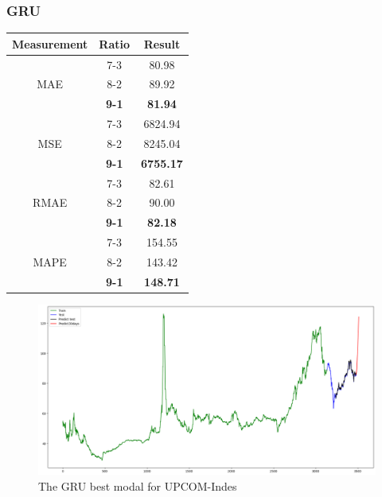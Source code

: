 \documentclass{ieeeojies}
\begin{document}
\subsubsection{GRU}
\begin{table}[H]
    \centering
    \begin{tabular}{|c|c|c|}
        \hline
         Measurement & Ratio &  Result  \\
        \hline
             & 7-3 & 80.98  \\
        MAE  & 8-2 &  89.92 \\
            & \textbf{9-1} & \textbf{81.94}  \\
        \hline
           & 7-3 & 6824.94  \\
        MSE  & 8-2 & 8245.04  \\
            & \textbf{9-1} & \textbf{6755.17}  \\
        \hline
           & 7-3 & 82.61  \\
        RMAE  & 8-2 & 90.00  \\
            & \textbf{9-1} & \textbf{82.18}  \\
        \hline
           & 7-3 & 154.55  \\
        MAPE  & 8-2 & 143.42  \\
            & \textbf{9-1} & \textbf{148.71}  \\
        \hline
    \end{tabular}
    \label{table:example}
\end{table}
\begin{figure}[H]
    \centering
    \includegraphics[width=0.8\linewidth]{GRU-UPC-91.png}
    \caption{The GRU best modal for UPCOM-Indes}
    \label{fig:example}
\end{figure}
\end{document}
